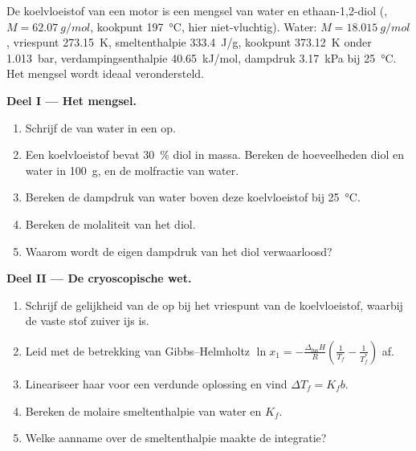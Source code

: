 \begin{problem}
\label{pb:b2:chemical-potential:1}
De koelvloeistof van een motor is een mengsel van water en ethaan-1,2-diol
(, $M = \qty{62.07}{g/mol}$, kookpunt \qty{197}{\celsius},
hier niet-vluchtig). Water: $M = \qty{18.015}{g/mol}$, vriespunt
\qty{273.15}{K}, smeltenthalpie \qty{333.4}{J/g}, kookpunt
\qty{373.12}{K} onder \qty{1.013}{bar}, verdampingsenthalpie
\qty{40.65}{kJ/mol}, dampdruk \qty{3.17}{kPa} bij \qty{25}{\celsius}.
Het mengsel wordt ideaal verondersteld.

\medskip
\noindent\textbf{Deel I --- Het mengsel.}
\begin{enumerate}
  \item Schrijf de  van water in een  op.
  \item Een koelvloeistof bevat \qty{30}{\percent} diol in massa. Bereken de
        hoeveelheden diol en water in \qty{100}{g}, en de molfractie van
        water.
  \item Bereken de dampdruk van water boven deze koelvloeistof bij
        \qty{25}{\celsius}.
  \item Bereken de molaliteit van het diol.
  \item Waarom wordt de eigen dampdruk van het diol verwaarloosd?
\end{enumerate}

\medskip
\noindent\textbf{Deel II --- De cryoscopische wet.}
\begin{enumerate}[resume]
  \item Schrijf de gelijkheid van de  op bij het vriespunt van
        de koelvloeistof, waarbij de vaste stof zuiver ijs is.
  \item Leid met de betrekking van Gibbs--Helmholtz $\ln x_1 =
        -\frac{\Delta_{\text{fus}}H}{R}\left(\frac1{T_f} - \frac1{T_f^*}\right)$ af.
  \item Lineariseer haar voor een verdunde oplossing en vind $\Delta T_f = K_f b$.
  \item Bereken de molaire smeltenthalpie van water en $K_f$.
  \item Welke aanname over de smeltenthalpie maakte de integratie?
\end{enumerate}


\end{problem}
